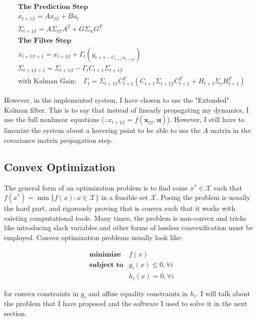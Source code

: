 \documentclass[conf]{new-aiaa}
\begin{document}
\begin{doublespace}
\begin{singlespace}
\begin{align*}
& \textbf{The Prediction Step}\\
&x_{t+1|t} = Ax_{t|t} + Bu_t \\
&\Sigma_{t+1|t} = A\Sigma_{t|t}A^T + G\Sigma_w G^T \\
& \textbf{The Filter Step}\\
&x_{t+1|t+1} = x_{t+1|t} + \Gamma_t (y_{t+1 - C_{t+1}x_{t+1|t}}) \\
&\Sigma_{t+1|t+1} = \Sigma_{t+1|t} - \Gamma_t C_{t+1}\Sigma_{t+1|t} \\ 
& \text{with Kalman Gain:}\quad \Gamma_t= \Sigma_{t+1|t}C_{t+1}^T(C_{t+1}\Sigma_{t+1|t} C_{t+1}^T + H_{t+1}\Sigma_vH_{t+1}^T)   
\end{align*}
\end{singlespace}

However, in the implemented system, I have chosen to use the "Extended" Kalman filter. This is to say that instead of linearly propagating my dynamics, I use the full nonlinear equations ($\therefore x_{t+1|t} = f(\mathbf{x}_{t|t},\mathbf{u})$). However, I still have to linearize the system about a hovering point to be able to use the $A$ matrix in the covariance matrix propagation step.

\subsection{Convex Optimization}
The general form of an optimization problem is to find some $\displaystyle x^\ast \in \mathcal{X}$ such that $\displaystyle f(x^{\ast })=\min\{f(x):x\in {\mathcal {X}}\}$ in a feasible set $\mathcal{X}$. Posing the problem is usually the hard part, and rigorously proving that is convex such that it works with existing computational tools. Many times, the problem is non-convex and tricks like introducing slack variables and other forms of lossless convexification must be employed. Convex optimization problems usually look like:

\begin{singlespace}
\begin{align*}
& \textbf{minimize} &f(x) \\ 
& \textbf{subject to} &g_i(x) \leq 0, \forall i \\
& & h_{i}(x)=0, \forall i
\end{align*}
\end{singlespace}

for convex constraints in $g_i$ and affine equality constraints in $h_i$. I will talk about the problem that I have proposed and the software I used to solve it in the next section.



\end{doublespace}
\end{document}
